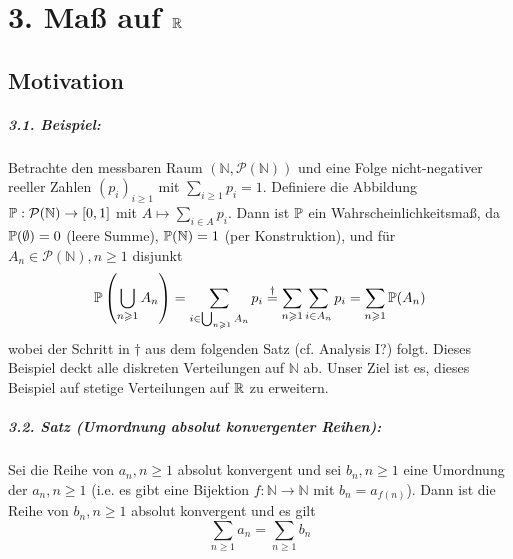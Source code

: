 \chapter*{3. Ma\ss{} auf $\mathbb{R}$}

\section*{Motivation}

\paragraph{3.1. Beispiel:}Betrachte den messbaren Raum $(\mathbb{N},\mathcal{P}(\mathbb{N}))$ und eine Folge nicht-negativer reeller Zahlen $(p_i)_{i\geq1}$ mit $\sum_{i\geq1}p_i=1$. Definiere die Abbildung $\mathbb{P}:\mathcal{P}(\mathbb{N})\to[0,1]$ mit $A\mapsto\sum_{i\in A}p_i$. Dann ist $\mathbb{P}$ ein Wahrscheinlichkeitsma\ss{}, da $\mathbb{P}(\emptyset)=0$ (leere Summe), $\mathbb{P}(\mathbb{N})=1$ (per Konstruktion), und f\"ur $A_n\in\mathcal{P}(\mathbb{N}), n\geq1$ disjunkt
$$\mathbb{P}\left(\bigcup_{n\geqslant1}A_n\right)=\sum_{i\in\bigcup_{n\geqslant1}A_n}p_i\overset{\dagger}{=}\sum_{n\geqslant1}\sum_{i\in A_n}p_i=\sum_{n\geqslant1}\mathbb{P}(A_n)$$
wobei der Schritt in $\dagger$ aus dem folgenden Satz (cf. Analysis I?) folgt. Dieses Beispiel deckt alle diskreten Verteilungen auf $\mathbb{N}$ ab. Unser Ziel ist es, dieses Beispiel auf stetige Verteilungen auf $\mathbb{R}$ zu erweitern.

\paragraph{3.2. Satz (Umordnung absolut konvergenter Reihen):}Sei die Reihe von $a_n,n\geq1$ absolut konvergent und sei $b_n,n\geq1$ eine Umordnung der $a_n,n\geq1$ (i.e. es gibt eine Bijektion $f:\mathbb{N}\to\mathbb{N}$ mit $b_n=a_{f(n)}$). Dann ist die Reihe von $b_n,n\geq1$ absolut konvergent und es gilt
$$\sum_{n\geq1}a_n=\sum_{n\geq1}b_n$$

